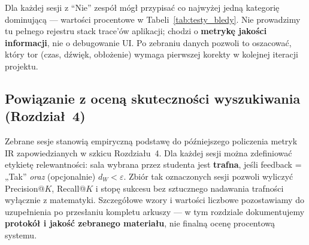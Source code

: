 \documentclass[14pt,a4paper]{extarticle}
\begin{document}
Dla każdej sesji z ``Nie'' zespół mógł przypisać co najwyżej jedną kategorię dominującą --- wartości procentowe w Tabeli~\ref{tab:testy_bledy}. Nie prowadzimy tu pełnego rejestru stack trace'ów aplikacji; chodzi o \textbf{metrykę jakości informacji}, nie o debugowanie UI. Po zebraniu danych pozwoli to oszacować, który tor (czas, dźwięk, obłożenie) wymaga pierwszej korekty w kolejnej iteracji projektu.

\begin{table}[H]
    \centering
    \caption{Klasyfikacja dominującej przyczyny niezadowolenia (sesje z feedbackiem ,,Nie'').}
    \label{tab:rozbieznosci}
\end{table}

\subsection{Powiązanie z oceną skuteczności wyszukiwania (Rozdział~4)}
Zebrane sesje stanowią empiryczną podstawę do późniejszego policzenia metryk IR zapowiedzianych w szkicu Rozdziału~4. Dla każdej sesji można zdefiniować etykietę relewantności: sala wybrana przez studenta jest \textbf{trafna}, jeśli feedback = „Tak” \emph{oraz} (opcjonalnie) $d_W < \varepsilon$. Zbiór tak oznaczonych sesji pozwoli wyliczyć Precision@$K$, Recall@$K$ i stopę sukcesu bez sztucznego nadawania trafności wyłącznie z matematyki. Szczegółowe wzory i wartości liczbowe pozostawiamy do uzupełnienia po przesłaniu kompletu arkuszy --- w tym rozdziale dokumentujemy \textbf{protokół i jakość zebranego materiału}, nie finalną ocenę procentową systemu.
\end{document}

